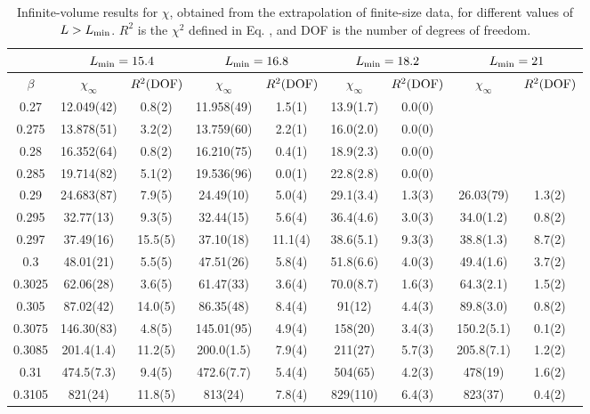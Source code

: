 \documentclass[12pt]{article}
\newcommand{\text}{\rm}
\begin{document}
\begin{table}
\begin{center}
{
\scriptsize

\begin{tabular}{|c||c|c||c|c||c|c||c|c||}
\hline
 & 
\multicolumn{2}{|c|}{$L_{\text{min}} = 15.4$} &
\multicolumn{2}{|c|}{$L_{\text{min}} = 16.8$} &
\multicolumn{2}{|c|}{$L_{\text{min}} = 18.2$} &
\multicolumn{2}{|c|}{$L_{\text{min}} = 21$} \\
\hline
$\beta$ 
& $\chi_{\infty}$ & $R^2(\text{DOF})$ 
& $\chi_{\infty}$ & $R^2(\text{DOF})$ 
& $\chi_{\infty}$ & $R^2(\text{DOF})$ 
& $\chi_{\infty}$ & $R^2(\text{DOF})$ \\
\hline
0.27   & 12.049(42) & 0.8(2)  & 11.958(49) &   1.5(1) & 13.9(1.7) &   0.0(0)  &  & \\
0.275  & 13.878(51) & 3.2(2)  & 13.759(60) &   2.2(1) & 16.0(2.0) &   0.0(0)  &  & \\
0.28   & 16.352(64) & 0.8(2)  & 16.210(75) &   0.4(1) & 18.9(2.3) &   0.0(0)  &  & \\
0.285  & 19.714(82) & 5.1(2)  & 19.536(96) &   0.0(1) & 22.8(2.8) &   0.0(0)  &  &  \\
0.29   & 24.683(87) & 7.9(5)  & 24.49(10) &   5.0(4)  & 29.1(3.4) &   1.3(3)  &  26.03(79) &   1.3(2)\\
0.295  & 32.77(13)  & 9.3(5)  & 32.44(15) &   5.6(4)  & 36.4(4.6) &   3.0(3)   & 34.0(1.2) &   0.8(2)\\
0.297  & 37.49(16)  & 15.5(5) & 37.10(18) &   11.1(4) & 38.6(5.1) & 9.3(3) & 38.8(1.3) &   8.7(2)\\
0.3    & 48.01(21) &  5.5(5)  & 47.51(26) &   5.8(4)  & 51.8(6.6) &   4.0(3)   & 49.4(1.6) &   3.7(2)\\
0.3025 & 62.06(28) &  3.6(5)  & 61.47(33) &   3.6(4)  & 70.0(8.7) &   1.6(3)   & 64.3(2.1) &   1.5(2)\\
0.305  & 87.02(42) &  14.0(5) & 86.35(48) &   8.4(4)  & 91(12) &   4.4(3)   & 89.8(3.0) &   0.8(2)\\
0.3075 & 146.30(83) & 4.8(5)  & 145.01(95) &   4.9(4) & 158(20) &   3.4(3)  & 150.2(5.1) &   0.1(2)\\
0.3085 & 201.4(1.4) & 11.2(5) & 200.0(1.5) &   7.9(4) & 211(27) &   5.7(3)     & 205.8(7.1) &   1.2(2)\\
0.31   & 474.5(7.3) & 9.4(5)  & 472.6(7.7) &   5.4(4) & 504(65) &   4.2(3)    & 478(19) &   1.6(2)\\
0.3105 & 821(24) &    11.8(5) & 813(24)    &   7.8(4) & 829(110)  & 6.4(3)       & 823(37) &   0.4(2)\\
\hline
\end{tabular}
}
\end{center}
\caption{Infinite-volume results for $\chi$, obtained from the 
extrapolation of finite-size data, for different values of 
  $L>L_{\text{min}}$. $R^2$ is the $\chi^2$ defined in Eq.
  , and DOF is the number of degrees of freedom.}
\label{table:extr_chi}
\end{table}
\end{document}

